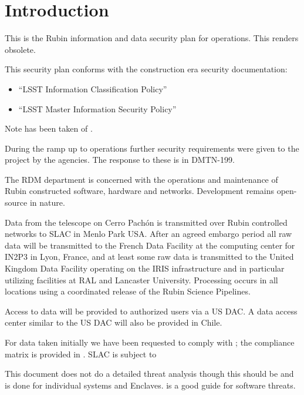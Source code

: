 

\section{Introduction}
This is the Rubin information and data security plan for operations.
This renders  obsolete.

This security plan conforms with the construction era security documentation:
\begin{itemize}
\item “LSST Information Classification Policy” 
\item “LSST Master Information Security Policy” 
\end{itemize}

Note has been taken of \cite{TCISSG}.

During the ramp up to operations further security requirements were given to the project by the agencies.
The response to these is in \gls{DMTN}-199.

The \gls{RDM} department is concerned with the operations and maintenance  of Rubin constructed software, hardware and networks.
Development remains open-source in nature.

Data from the telescope on Cerro Pach\'{o}n is transmitted over Rubin controlled networks to \gls{SLAC} in  Menlo Park USA.
After an agreed embargo period all raw data will be transmitted to the French Data Facility at the computing center for \gls{IN2P3} in Lyon, France, and at least some raw data is transmitted to the United Kingdom Data Facility operating on the IRIS infrastructure and in particular utilizing facilities at \gls{RAL} and Lancaster University.
Processing occurs in all locations using a coordinated release of the Rubin \gls{Science Pipelines}.

Access to data will be provided to authorized  users via a US \gls{DAC}.
A data access center similar to the \gls{US} \gls{DAC} will also be provided in Chile.

For data taken initially we have been requested to comply with ; the compliance matrix is provided in  .
SLAC is subject to 


This document does not do a detailed threat analysis though this should be and is done for individual systems and \gls{Enclave}s. \cite{TCISSG} is a good guide for software threats.








